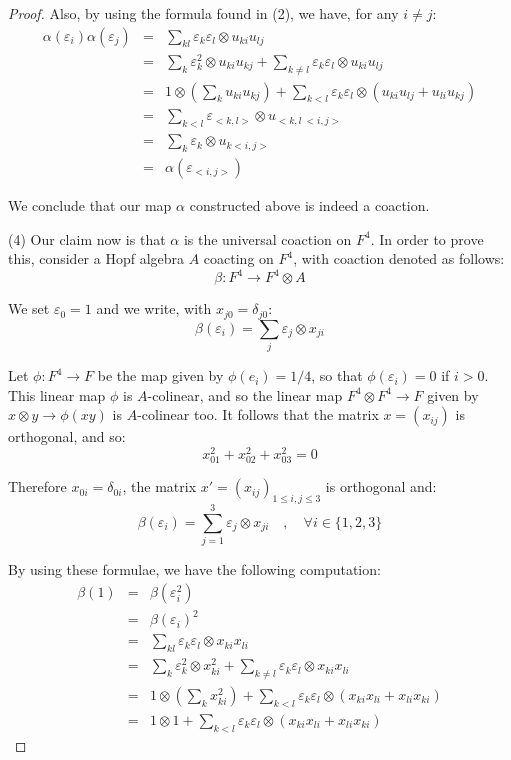 \documentclass[10pt,a4paper]{amsart}
\begin{document}
\begin{proof}
Also, by using the formula found in (2), we have, for any $i\neq j$:
\begin{eqnarray*}
\alpha(\varepsilon_i)\alpha(\varepsilon_j)
&=&\sum_{kl}\varepsilon_k\varepsilon_l\otimes u_{ki}u_{lj}\\
&=&\sum_k\varepsilon_k^2\otimes u_{ki}u_{kj}+\sum_{k\neq l}\varepsilon_k\varepsilon_l\otimes
 u_{ki}u_{lj}\\
&=&1\otimes\left(\sum_ku_{ki}u_{kj}\right)+\sum_{k<l}\varepsilon_k\varepsilon_l\otimes(u_{ki}u_{lj}+u_{li}u_{kj})\\
&=&\sum_{k<l}\varepsilon_{<k,l>}\otimes u_{<k,l\><i,j>}\\
&=&\sum_k\varepsilon_k\otimes u_{k< i,j>}\\
&=&\alpha(\varepsilon_{<i,j>})
\end{eqnarray*}

We conclude that our map $\alpha$ constructed above is indeed a coaction.

\medskip

(4) Our claim now is that $\alpha$ is the universal coaction on $F^4$. In order to prove this, consider a Hopf algebra $A$ coacting on $F^4$, with coaction denoted as follows:
$$\beta :F^4 \to F^4 \otimes A$$

We set $\varepsilon_0 =1$ and we write, with $x_{j0}=\delta_{j0}$: 
$$\beta(\varepsilon_i)=\sum_j\varepsilon_j\otimes x_{ji}$$

Let $\phi :F^4 \to F$ be the map given by $\phi(e_i) =1/4$, so that $\phi(\varepsilon_i)=0$ if $i>0$. This linear map $\phi$ is $A$-colinear, and so the linear map $F^4 \otimes F^4 \to F$ given by $x\otimes y\to\phi(xy)$ is $A$-colinear too. It follows that the matrix $x = (x_{ij})$ is orthogonal, and so:
$$x_{01}^2+x_{02}^2 + x_{03}^2=0$$

Therefore $x_{0i} = \delta_{0i}$, the matrix $x' =(x_{ij})_{1\leq i,j\leq3}$ is orthogonal and:
$$\beta(\varepsilon_i) = \sum_{j=1}^3 \varepsilon_j \otimes x_{ji}\quad,\quad\forall i\in\{1,2,3\}$$
 
By using these formulae, we have the following computation:
\begin{eqnarray*}
\beta(1)
&=&\beta(\varepsilon_i^2)\\
&=&\beta(\varepsilon_i)^2\\
&=&\sum_{kl}\varepsilon_k\varepsilon_l\otimes x_{ki}x_{li}\\
&=&\sum_k\varepsilon_k^2\otimes x_{ki}^2+\sum_{k\neq l}\varepsilon_k\varepsilon_l\otimes
 x_{ki}x_{li}\\
&=&1\otimes\left(\sum_kx_{ki}^2\right)+\sum_{k<l}\varepsilon_k\varepsilon_l\otimes (x_{ki}x_{li} +x_{li}x_{ki})\\
&=&1\otimes 1+\sum_{k<l}\varepsilon_k\varepsilon_l\otimes(x_{ki}x_{li}+x_{li}x_{ki})
\end{eqnarray*}


\end{proof}
\end{document}
